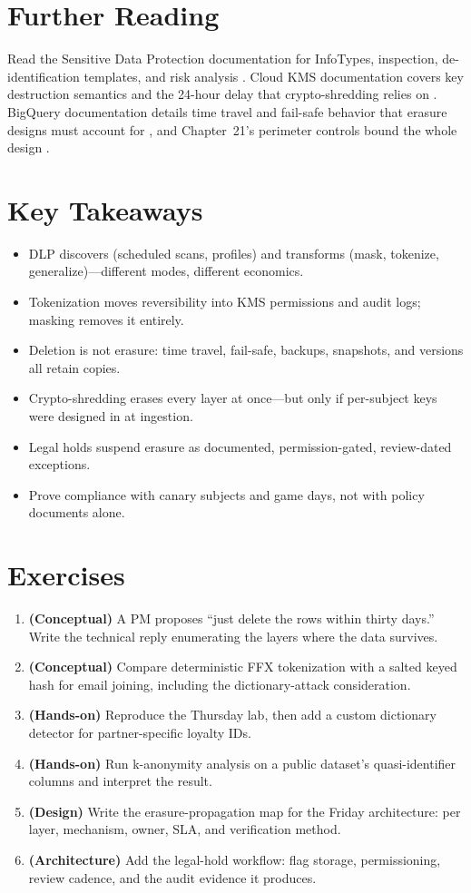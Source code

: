 \section{Further Reading}
Read the Sensitive Data Protection documentation for InfoTypes, inspection, de-identification templates, and risk analysis \cite{googleclouddlpdocs}. Cloud KMS documentation covers key destruction semantics and the 24-hour delay that crypto-shredding relies on \cite{googlecloudkmsdocs}. BigQuery documentation details time travel and fail-safe behavior that erasure designs must account for \cite{googlecloudbigquerydocs}, and Chapter~21's perimeter controls bound the whole design \cite{googlecloudvpcscdocs}.

\section*{Key Takeaways}
\begin{itemize}
    \item DLP discovers (scheduled scans, profiles) and transforms (mask, tokenize, generalize)---different modes, different economics.
    \item Tokenization moves reversibility into KMS permissions and audit logs; masking removes it entirely.
    \item Deletion is not erasure: time travel, fail-safe, backups, snapshots, and versions all retain copies.
    \item Crypto-shredding erases every layer at once---but only if per-subject keys were designed in at ingestion.
    \item Legal holds suspend erasure as documented, permission-gated, review-dated exceptions.
    \item Prove compliance with canary subjects and game days, not with policy documents alone.
\end{itemize}

\section{Exercises}
\begin{enumerate}
    \item \textbf{(Conceptual)} A PM proposes ``just delete the rows within thirty days.'' Write the technical reply enumerating the layers where the data survives.
    \item \textbf{(Conceptual)} Compare deterministic FFX tokenization with a salted keyed hash for email joining, including the dictionary-attack consideration.
    \item \textbf{(Hands-on)} Reproduce the Thursday lab, then add a custom dictionary detector for partner-specific loyalty IDs.
    \item \textbf{(Hands-on)} Run k-anonymity analysis on a public dataset's quasi-identifier columns and interpret the result.
    \item \textbf{(Design)} Write the erasure-propagation map for the Friday architecture: per layer, mechanism, owner, SLA, and verification method.
    \item \textbf{(Architecture)} Add the legal-hold workflow: flag storage, permissioning, review cadence, and the audit evidence it produces.
\end{enumerate}
